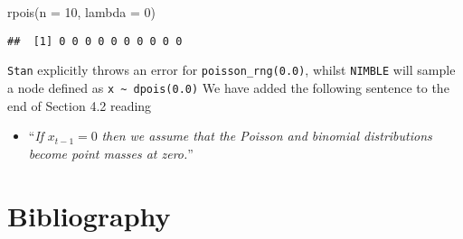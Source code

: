 \documentclass[
  10pt,
  a4paper,
]{article}
\newenvironment{Shaded}{\begin{snugshade}}{\end{snugshade}}
\newcommand{\AttributeTok}[1]{\textcolor[rgb]{0.77,0.63,0.00}{#1}}
\newcommand{\DecValTok}[1]{\textcolor[rgb]{0.00,0.00,0.81}{#1}}
\newcommand{\FunctionTok}[1]{\textcolor[rgb]{0.00,0.00,0.00}{#1}}
\newcommand{\NormalTok}[1]{#1}
\providecommand{\tightlist}{%
  \setlength{\itemsep}{0pt}\setlength{\parskip}{0pt}}
\begin{document}
\begin{Shaded}
\begin{Highlighting}[]
\FunctionTok{rpois}\NormalTok{(}\AttributeTok{n =} \DecValTok{10}\NormalTok{, }\AttributeTok{lambda =} \DecValTok{0}\NormalTok{)}
\end{Highlighting}
\end{Shaded}

\begin{verbatim}
##  [1] 0 0 0 0 0 0 0 0 0 0
\end{verbatim}

\texttt{Stan} explicitly throws an error for \texttt{poisson\_rng(0.0)},
whilst \texttt{NIMBLE} will sample a node defined as
\texttt{x\ \textasciitilde{}\ dpois(0.0)} We have added the following
sentence to the end of Section 4.2 reading

\begin{itemize}
\tightlist
\item
  ``\emph{If} \(x_{t - 1} = 0\) \emph{then we assume that the Poisson
  and binomial distributions become point masses at zero.}''
\end{itemize}

\hypertarget{bibliography}{%
\section*{Bibliography}\label{bibliography}}
\end{document}
